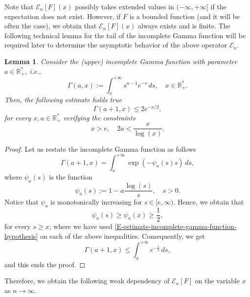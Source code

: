 \documentclass[reqno]{amsart}
\newtheorem{lemma}[definition]{Lemma}
\numberwithin{equation}{section}
\begin{document}
{Note that $\mathcal{E}_n[F](x)$ possibly takes extended values in $(-\infty,+\infty]$ if the expectation does not exist. However, if $F$ is a bounded function (and it will be often the case), we obtain that $\mathcal{E}_n[F](x)$ always exists and is finite. The following technical lemma for the tail of the incomplete Gamma function will be required later to determine the asymptotic behavior of the above operator $\mathcal{E}_n$.

\begin{lemma}\label{L-estimate-incomplete-gamma-function}
Consider the (upper) incomplete Gamma function with parameter $a\in \mathbb{R}_+^*$, {\em i.e.},
\begin{equation}\label{E-incomplete-gamma-function}
\Gamma(a,x):=\int_x^{+\infty} s^{a-1} e^{-s}\,ds,\quad x\in \mathbb{R}_+^*.
\end{equation}
Then, the following estimate holds true
\begin{equation}\label{E-estimate-incomplete-gamma-function}
\Gamma(a+1,x)\leq 2e^{-x/2},
\end{equation}
for every $x,a\in \mathbb{R}_+^*$ verifying the constraints
\begin{equation}\label{E-estimate-incomplete-gamma-function-hypothesis}
x>e, \quad 2a<\frac{x}{\log(x)}.
\end{equation}
\end{lemma}

\begin{proof}
Let us restate the incomplete Gamma function as follows
$$\Gamma(a+1,x)=\int_x^{+\infty}\exp(-\psi_a(s) s)\,ds,$$
where $\psi_a(s)$ is the function
$$\psi_a(s):=1-a\frac{\log(s)}{s},\quad s>0.$$
Notice that $\psi_a$ is monotonically increasing for $s\in [e,\infty)$. Hence, we obtain that
$$\psi_a(s)\geq \psi_a(x)\geq \frac{1}{2},$$
for every $s\geq x$, where we have used \eqref{E-estimate-incomplete-gamma-function-hypothesis} on each of the above inequalities. Consequently, we get
$$\Gamma(a+1,x)\leq \int_x^{+\infty} e^{-\frac{s}{2}}\,ds,$$
and this ends the proof.
\end{proof}

Therefore, we obtain the following weak dependency of $\mathcal{E}_n[F]$ on the variable $x$ as $n\rightarrow \infty$.

}
\end{document}
